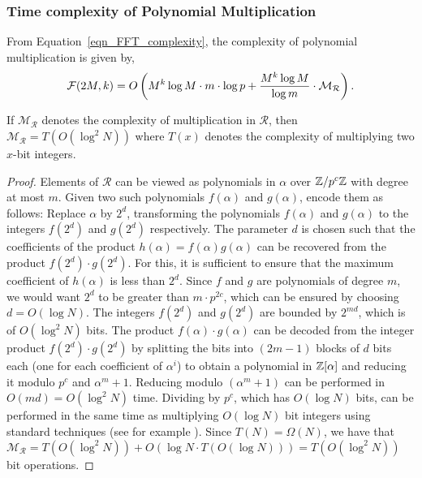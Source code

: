 \documentclass[11pt]{article}
\begin{document}
\subsubsection*{Time complexity of Polynomial Multiplication}

From Equation~\ref{eqn_FFT_complexity}, the complexity of polynomial multiplication is given by,
\[
\mathcal{F}(2M,k) = O\left(M^k\log M\cdot m\cdot \log p + \frac{M^k\log
    M}{\log m}\cdot \mathcal{M}_{\mathcal{R}}\right).
\]

\begin{proposition}\cite{scho_complex}
  If $\mathcal{M}_{\mathcal{R}}$ denotes the complexity of
  multiplication in $\mathcal{R}$, then $\mathcal{M}_{\mathcal{R}} =
  T\left(O(\log^2{N})\right)$ where $T(x)$ denotes the complexity of
  multiplying two $x$-bit integers.
\end{proposition}
\begin{proof}
  Elements of $\mathcal{R}$ can be viewed as polynomials in $\alpha$
  over $\mathbb{Z}/p^c\mathbb{Z}$ with degree at most $m$. Given two such polynomials
  $f(\alpha)$ and $g(\alpha)$, encode them as follows: Replace
  $\alpha$ by $2^d$, transforming the polynomials $f(\alpha)$ and
  $g(\alpha)$ to the integers $f(2^d)$ and $g(2^d)$ respectively.  The
  parameter $d$ is chosen such that the coefficients of the product
  $h(\alpha) = f(\alpha) g(\alpha)$ can be recovered from the product
  $f(2^d)\cdot g(2^d)$. For this, it is sufficient to ensure that the
  maximum coefficient of $h(\alpha)$ is less than $2^d$.  Since $f$
  and $g$ are polynomials of degree $m$, we would want $2^d$ to be
  greater than $m\cdot p^{2c}$, which can be ensured by choosing $d =
  O\left(\log{N}\right)$. The integers $f(2^d)$ and $g(2^d)$ are
  bounded by $2^{md}$, which is of $O(\log^2 N)$ bits. The product
  $f(\alpha)\cdot g(\alpha)$ can be decoded from the integer product
  $f(2^d)\cdot g(2^d)$ by splitting the bits into $(2m-1)$ blocks of
  $d$ bits each (one for each coefficient of $\alpha^i$) to obtain a
  polynomial in $\mathbb{Z}[\alpha]$ and reducing it modulo $p^c$ and
  $\alpha^m + 1$. Reducing modulo $(\alpha^m + 1)$ can be performed in
  $O(md) = O(\log^2N)$ time. Dividing by $p^c$, which has $O(\log N)$
  bits, can be performed in the same time as multiplying $O(\log N)$
  bit integers using standard techniques (see for example
  \cite[Chapter 4]{Knuth}). Since $T(N) = \Omega(N)$, we have that
  $\mathcal{M}_{\mathcal{R}} = T(O(\log^2 N)) + O(\log N \cdot
  T(O(\log N))) = T(O(\log^2 N))$ bit operations.
\end{proof}
\end{document}
